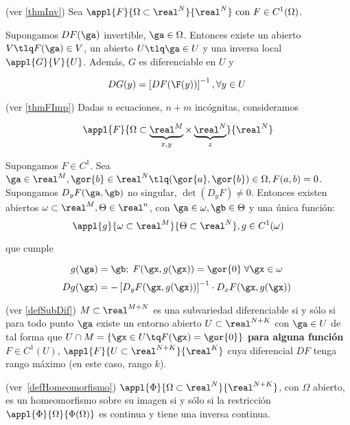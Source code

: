 \begin{theorem}  (ver \ref{thmInv})
Sea $\appl{F}{\Omega\subset\real^N}{\real^N} \text{ con } F\in C^1(\Omega)$.

Supongamos $DF(\ga)$ invertible, $\ga \in \Omega$. Entonces existe un abierto $V \tlq F(\ga)\in V$, un abierto $U \tlq \ga \in U$ y una inversa local $\appl{G}{V}{U}$. Además, $G$ es diferenciable en $U$ y

\[ DG(y) = \left[DF(\F(y))\right]^{-1}, \forall y \in U \]
\end{theorem}

\begin{theorem} (ver \ref{thmFImp}) Dadas $n$ ecuaciones, $n+m$ incógnitas, consideramos

$$\appl{F}{\Omega\subset\underbrace{\real^M}_{x,y} \times \underbrace{\real^N}_{z}}{\real^N}$$

Supongamos $F\in C^1$. Sea $\ga \in \real^M, \gor{b} \in \real^N \tlq (\gor{a},\gor{b})\in \Omega , F(a,b)=0$. Supongamos $D_yF(\ga,\gb)$ no singular, $\det(D_yF)\neq 0$. Entonces existen abiertos $\omega \subset \real^M, \Theta \in\real^n$, con $\ga \in \omega, \gb \in \Theta$ y una única función: \[ \appl{g}{\omega\subset\real^M}{\Theta \subset\real^N}, g\in C^1(\omega) \]

que cumple

\[ g(\ga) = \gb;\; F(\gx,g(\gx)) = \gor{0}\; \forall \gx \in \omega \]
\[ Dg(\gx) = - \left[D_yF(\gx,g(\gx))\right]^{-1} \cdot D_xF(\gx,g(\gx)) \]
\end{theorem}

 \begin{defn}(ver \ref{defSubDif}) $M \subset \real^{M+N}$ es una subvariedad diferenciable si y sólo si para todo punto $\ga$ existe un entorno abierto $U \subset \real^{N+K}$ con $\ga \in U$ de tal forma que $U \cap M = \{\gx\in U\tq F(\gx) = \gor{0}\}$ \textbf{para alguna función} $F\in C^1(U)$, $\appl{F}{U\subset \real^{N+K}}{\real^K}$ cuya diferencial $DF$ tenga rango máximo (en este caso, rango $k$).
  \end{defn}

  \begin{defn}[Homeomorfismo][] (ver \ref{defHomeomorfismo}) $\appl{\Phi}{\Omega\subset\real^N}{\real^{N+K}}$, con $\Omega$ abierto, es un homeomorfismo sobre su imagen si y sólo si la restricción $\appl{\Phi}{\Omega}{\Phi(\Omega)}$ es continua y tiene una inversa continua.
  \end{defn}


